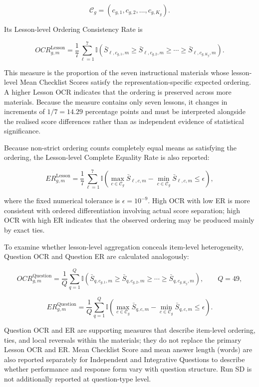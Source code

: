 \[
\mathcal C_g
=
(c_{g,1},c_{g,2},\ldots,c_{g,K_g}).
\]

Its Lesson-level Ordering Consistency Rate is

\[
OCR^{\mathrm{Lesson}}_{g,m}
=
\frac{1}{7}
\sum_{\ell=1}^{7}
\mathbb I
\left(
\bar S_{\ell,c_{g,1},m}
\ge
\bar S_{\ell,c_{g,2},m}
\ge
\cdots
\ge
\bar S_{\ell,c_{g,K_g},m}
\right).
\]

This measure is the proportion of the seven instructional materials whose lesson-level Mean Checklist Scores satisfy the representation-specific expected ordering. A higher Lesson OCR indicates that the ordering is preserved across more materials. Because the measure contains only seven lessons, it changes in increments of $1/7=14.29$ percentage points and must be interpreted alongside the realised score differences rather than as independent evidence of statistical significance.

Because non-strict ordering counts completely equal means as satisfying the ordering, the Lesson-level Complete Equality Rate is also reported:

\[
ER^{\mathrm{Lesson}}_{g,m}
=
\frac{1}{7}
\sum_{\ell=1}^{7}
\mathbb I
\left(
\max_{c\in\mathcal C_g}\bar S_{\ell,c,m}
-
\min_{c\in\mathcal C_g}\bar S_{\ell,c,m}
\le \epsilon
\right),
\]

where the fixed numerical tolerance is $\epsilon=10^{-9}$. High OCR with low ER is more consistent with ordered differentiation involving actual score separation; high OCR with high ER indicates that the observed ordering may be produced mainly by exact ties.

To examine whether lesson-level aggregation conceals item-level heterogeneity, Question OCR and Question ER are calculated analogously:

\[
OCR^{\mathrm{Question}}_{g,m}
=
\frac{1}{Q}
\sum_{q=1}^{Q}
\mathbb I
\left(
\bar S_{q,c_{g,1},m}
\ge
\bar S_{q,c_{g,2},m}
\ge
\cdots
\ge
\bar S_{q,c_{g,K_g},m}
\right),
\qquad Q=49,
\]

\[
ER^{\mathrm{Question}}_{g,m}
=
\frac{1}{Q}
\sum_{q=1}^{Q}
\mathbb I
\left(
\max_{c\in\mathcal C_g}\bar S_{q,c,m}
-
\min_{c\in\mathcal C_g}\bar S_{q,c,m}
\le \epsilon
\right).
\]

Question OCR and ER are supporting measures that describe item-level ordering, ties, and local reversals within the materials; they do not replace the primary Lesson OCR and ER. Mean Checklist Score and mean answer length (words) are also reported separately for Independent and Integrative Questions to describe whether performance and response form vary with question structure. Run SD is not additionally reported at question-type level.

